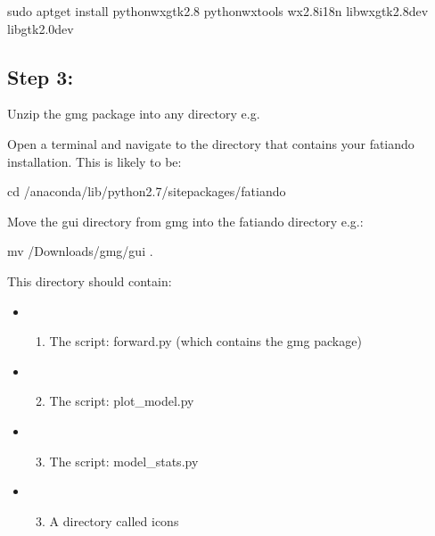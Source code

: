 \documentclass[a4paper,10pt,english]{sphinxmanual}
\begin{document}
%
\begin{sphinxVerbatim}[commandchars=\\\{\}]
sudo apt\PYGZhy{}get install python\PYGZhy{}wxgtk2.8 python\PYGZhy{}wxtools wx2.8\PYGZhy{}i18n libwxgtk2.8\PYGZhy{}dev libgtk2.0\PYGZhy{}dev
\end{sphinxVerbatim}


\subsection{Step 3:}
\label{\detokenize{installation:step-3}}
Unzip the gmg package into any directory e.g. 

Open a terminal and navigate to the directory that contains your fatiando installation.
This is likely to be:

%
\begin{sphinxVerbatim}[commandchars=\\\{\}]
cd \PYGZti{}/anaconda/lib/python2.7/site\PYGZhy{}packages/fatiando
\end{sphinxVerbatim}

Move the gui directory from gmg into the fatiando directory e.g.:

%
\begin{sphinxVerbatim}[commandchars=\\\{\}]
mv \PYGZti{}/Downloads/gmg/gui .
\end{sphinxVerbatim}

This directory should contain:
\begin{itemize}
\item {} \begin{enumerate}
\item {} 
The script: forward.py (which contains the gmg package)

\end{enumerate}

\item {} \begin{enumerate}
\setcounter{enumi}{1}
\item {} 
The script: plot\_model.py

\end{enumerate}

\item {} \begin{enumerate}
\setcounter{enumi}{2}
\item {} 
The script: model\_stats.py

\end{enumerate}

\item {} \begin{enumerate}
\setcounter{enumi}{2}
\item {} 
A directory called icons

\end{enumerate}

\end{itemize}
\end{document}
